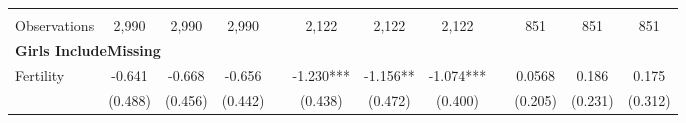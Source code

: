 \begin{landscape}
\begin{table}[htpb!]
\begin{center}
\begin{tabular}{lcccp{2mm}cccp{2mm}ccc}
\begin{footnotesize}\end{footnotesize}&\begin{footnotesize}\end{footnotesize}&\begin{footnotesize}\end{footnotesize}&\begin{footnotesize}\end{footnotesize}&\begin{footnotesize}\end{footnotesize}&\begin{footnotesize}\end{footnotesize}&\begin{footnotesize}\end{footnotesize}&\begin{footnotesize}\end{footnotesize}&\begin{footnotesize}\end{footnotesize}&\begin{footnotesize}\end{footnotesize}&\begin{footnotesize}\end{footnotesize}&\begin{footnotesize}\end{footnotesize}\\Observations&2,990&2,990&2,990&&2,122&2,122&2,122&&851&851&851\\
\multicolumn{12}{l}{\textbf{Girls IncludeMissing}}\\ 
Fertility&-0.641&-0.668&-0.656&&-1.230***&-1.156**&-1.074***&&0.0568&0.186&0.175\\
&(0.488)&(0.456)&(0.442)&&(0.438)&(0.472)&(0.400)&&(0.205)&(0.231)&(0.312)\\

\end{tabular}
\end{center}
\end{table}
\end{landscape}
